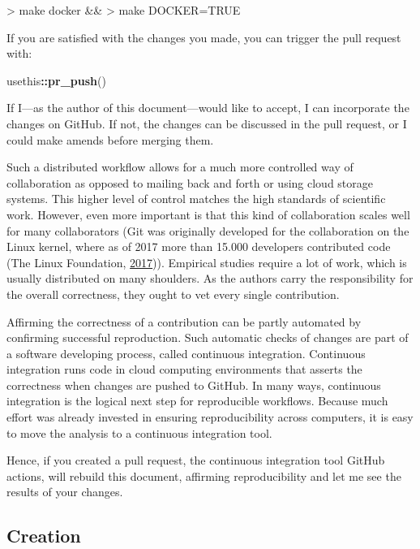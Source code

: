\documentclass[12pt,a4paper,twoside]{article}
\newenvironment{Shaded}{\begin{snugshade}}{\end{snugshade}}
\newcommand{\KeywordTok}[1]{\textcolor[rgb]{0.13,0.29,0.53}{\textbf{#1}}}
\newcommand{\NormalTok}[1]{#1}
\newcommand{\OperatorTok}[1]{\textcolor[rgb]{0.81,0.36,0.00}{\textbf{#1}}}
\let\oldverbatim\verbatim
\let\endoldverbatim\endverbatim
\renewenvironment{verbatim}{\footnotesize\oldverbatim}{\endoldverbatim}
\begin{document}
\begin{verbatim}
>   make docker &&
>   make DOCKER=TRUE
\end{verbatim}

If you are satisfied with the changes you made, you can trigger the pull request with:

\begin{Shaded}
\begin{Highlighting}[]
\NormalTok{usethis}\OperatorTok{::}\KeywordTok{pr_push}\NormalTok{()}
\end{Highlighting}
\end{Shaded}

If I---as the author of this document---would like to accept, I can incorporate the changes on GitHub.
If not, the changes can be discussed in the pull request, or I could make amends before merging them.

Such a distributed workflow allows for a much more controlled way of collaboration as opposed to mailing back and forth or using cloud storage systems.
This higher level of control matches the high standards of scientific work.
However, even more important is that this kind of collaboration scales well for many collaborators (Git was originally developed for the collaboration on the Linux kernel, where as of 2017 more than 15.000 developers contributed code (The Linux Foundation, \protect\hyperlink{ref-thelinuxfoundation2017LinuxKernel2017}{2017})).
Empirical studies require a lot of work, which is usually distributed on many shoulders.
As the authors carry the responsibility for the overall correctness, they ought to vet every single contribution.

Affirming the correctness of a contribution can be partly automated by confirming successful reproduction.
Such automatic checks of changes are part of a software developing process, called continuous integration.
Continuous integration runs code in cloud computing environments that asserts the correctness when changes are pushed to GitHub.
In many ways, continuous integration is the logical next step for reproducible workflows.
Because much effort was already invested in ensuring reproducibility across computers, it is easy to move the analysis to a continuous integration tool.

Hence, if you created a pull request, the continuous integration tool GitHub actions, will rebuild this document, affirming reproducibility and let me see the results of your changes.

\hypertarget{creation}{%
\subsection{Creation}\label{creation}}
\end{document}
